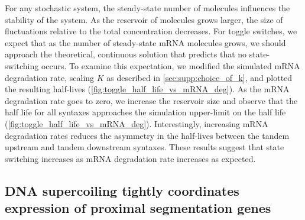 \documentclass[11pt]{article} %
\begin{document}
For any stochastic system, the steady-state number of molecules influences the stability of the system. As the reservoir of molecules grows larger, the size of fluctuations relative to the total concentration decreases. For toggle switches, we expect that as the number of steady-state mRNA molecules grows, we should approach the theoretical, continuous solution that predicts that no state-switching occurs. To examine this expectation, we modified the simulated mRNA degradation rate, scaling \(K\) as described in \cref{sec:supp:choice_of_k}, and plotted the resulting half-lives (\cref{fig:toggle_half_life_vs_mRNA_deg}).
As the mRNA degradation rate goes to zero, we increase the reservoir size and observe that the half life for all syntaxes approaches the simulation upper-limit on the half life (\cref{fig:toggle_half_life_vs_mRNA_deg}).  Interestingly, increasing mRNA degradation rates reduces the asymmetry in the half-lives between the tandem upstream and tandem downstream syntaxes. These results suggest that state switching increases as mRNA degradation rate increases as expected.


\subsection{DNA supercoiling tightly coordinates expression of proximal segmentation genes}
\end{document}
